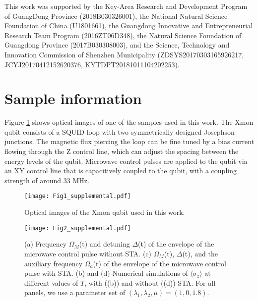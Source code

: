 \documentclass[aps,reprint,groupedaddress,showpacs,superscriptaddress]{revtex4-1}
\begin{document}
\begin{acknowledgments}
This work was supported by the Key-Area Research and Development Program of GuangDong Province (2018B030326001), the National Natural Science Foundation of China (U1801661), the Guangdong Innovative and Entrepreneurial Research Team Program (2016ZT06D348), the Natural Science Foundation of Guangdong Province (2017B030308003), and the Science, Technology and Innovation Commission of Shenzhen Municipality (ZDSYS20170303165926217, JCYJ20170412152620376, KYTDPT20181011104202253).  
\end{acknowledgments}






\appendix



\section{Sample information}
Figure \ref{supply_sample} shows optical images of one of the samples used in this work. The Xmon qubit consists of a SQUID loop with two symmetrically designed Josephson junctions. The magnetic flux piercing the loop can be fine tuned by a bias current flowing through the Z control line, which can adjust the spacing between the energy levels of the qubit. Microwave control pulses are applied to the qubit via an XY control line that is capacitively coupled to the qubit, with a coupling strength of around 33 MHz. 


\begin{figure}[!htbp]
	\centering
	\texttt{[image: Fig1\_supplemental.pdf]}
	\caption{Optical images of the Xmon qubit used in this work.}\label{supply_sample}
\end{figure}


\begin{figure}[!htbp]
	\centering
	\texttt{[image: Fig2\_supplemental.pdf]}
	\caption{(a) Frequency $\Omega_M$(t) and detuning $\Delta$(t) of the envelope of the microwave control pulse without STA. (c) $\Omega_M$(t), $\Delta$(t), and the auxiliary frequency $\Omega_a$(t) of the envelope of the microwave control pulse with STA. (b) and (d) Numerical simulations of $\langle\sigma_{z}\rangle$ at different values of $T$, with ((b)) and without ((d)) STA. For all panels, we use a parameter set of $(\lambda_{1},\lambda_{2},\mu) = (1,0,1.8)$.}\label{supply_pulse}
\end{figure}
\end{document}
